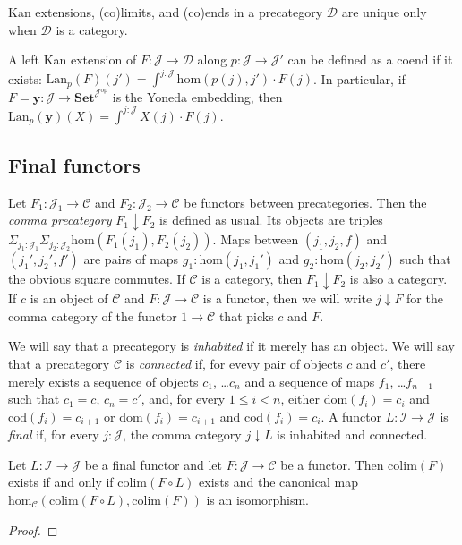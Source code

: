\documentclass[reqno]{amsart}
\theoremstyle{definition}
\theoremstyle{remark}
\newcommand{\fs}[1]{\mathrm{#1}}
\newcommand{\cat}[1]{\mathbf{#1}}
\newcommand{\scat}[1]{\mathcal{#1}}
\renewcommand{\hom}{\fs{hom}}
\newcommand{\Set}{\cat{Set}}
\numberwithin{figure}{section}
\begin{document}
\begin{remark}
Kan extensions, (co)limits, and (co)ends in a precategory $\scat{D}$ are unique only when $\scat{D}$ is a category.
\end{remark}

A left Kan extension of $F : \scat{J} \to \scat{D}$ along $p : \scat{J} \to \scat{J}'$ can be defined as a coend if it exists: $\fs{Lan}_p(F)(j') = \int^{j : \scat{J}} \hom(p(j),j') \cdot F(j)$.
In particular, if $F = \cat{y} : \scat{J} \to \Set^{\scat{J}^\fs{op}}$ is the Yoneda embedding, then $\fs{Lan}_p(\cat{y})(X) = \int^{j : \scat{J}} X(j) \cdot F(j)$.

\subsection{Final functors}

Let $F_1 : \scat{J}_1 \to \scat{C}$ and $F_2 : \scat{J}_2 \to \scat{C}$ be functors between precategories.
Then the \emph{comma precategory} $F_1 \downarrow F_2$ is defined as usual.
Its objects are triples $\Sigma_{j_1 : \scat{J}_1} \Sigma_{j_2 : \scat{J}_2} \hom(F_1(j_1),F_2(j_2))$.
Maps between $(j_1,j_2,f)$ and $(j_1',j_2',f')$ are pairs of maps $g_1 : \hom(j_1,j_1')$ and $g_2 : \hom(j_2,j_2')$ such that the obvious square commutes.
If $\scat{C}$ is a category, then $F_1 \downarrow F_2$ is also a category.
If $c$ is an object of $\scat{C}$ and $F : \scat{J} \to \scat{C}$ is a functor, then we will write $j \downarrow F$ for the comma category of the functor $1 \to \scat{C}$ that picks $c$ and $F$.

We will say that a precategory is \emph{inhabited} if it merely has an object.
We will say that a precategory $\scat{C}$ is \emph{connected} if, for evevy pair of objects $c$ and $c'$, there merely exists a sequence of objects $c_1$, \ldots $c_n$ and a sequence of maps $f_1$, \ldots $f_{n-1}$
such that $c_1 = c$, $c_n = c'$, and, for every $1 \leq i < n$, either $\fs{dom}(f_i) = c_i$ and $\fs{cod}(f_i) = c_{i+1}$ or $\fs{dom}(f_i) = c_{i+1}$ and $\fs{cod}(f_i) = c_i$.
A functor $L : \scat{I} \to \scat{J}$ is \emph{final} if, for every $j : \scat{J}$, the comma category $j \downarrow L$ is inhabited and connected.

\begin{lem}
Let $L : \scat{I} \to \scat{J}$ be a final functor and let $F : \scat{J} \to \scat{C}$ be a functor.
Then $\fs{colim}(F)$ exists if and only if $\fs{colim}(F \circ L)$ exists and the canonical map $\hom_\scat{C}(\fs{colim}(F \circ L),\fs{colim}(F))$ is an isomorphism.
\end{lem}
\begin{proof}
\end{proof}
\end{document}
